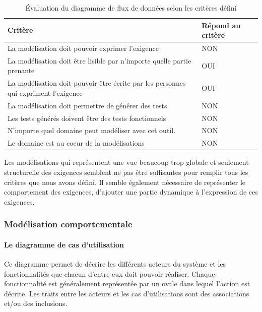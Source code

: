     \begin{table}[H]
    \centering
     \begin{tabular}{|p{25em}|p{5em}|} 
     \hline
    Critère & Répond au critère \\ [0.5ex] 
     \hline
     La modélisation doit pouvoir exprimer l’exigence & \cellcolor[HTML]{D03737}NON\\
     \hline
    La modélisation doit être lisible par n’importe quelle partie prenante & \cellcolor[HTML]{699A73}OUI\\
     \hline
    La modélisation doit pouvoir être écrite par les personnes qui expriment l’exigence &\cellcolor[HTML]{699A73} OUI \\
     \hline
    La modélisation doit permettre de générer des tests & \cellcolor[HTML]{D03737}NON \\
     \hline
    Les tests générés doivent être des tests fonctionnels &\cellcolor[HTML]{D03737} NON\\ 
     \hline
    N’importe quel domaine peut modéliser avec cet outil.&\cellcolor[HTML]{D03737} NON\\ 
     \hline
    Le domaine est au coeur de la modélisations &\cellcolor[HTML]{D03737} NON\\ 
    \hline 
    \end{tabular}
    \caption{Évaluation du diagramme de flux de données selon les critères défini}
    \end{table}

    Les modélisations qui représentent une vue beaucoup trop globale et seulement structurelle des exigences semblent ne pas être suffisantes pour remplir tous les critères que nous avons défini. Il semble également nécessaire de représenter le comportement des exigences, d'ajouter une partie dynamique à l'expression de ces exigences. 
        
        \subsubsection{Modélisation comportementale}

            \paragraph{Le diagramme de cas d'utilisation}

            Ce diagramme permet de décrire les différents acteurs du système et les fonctionnalités que chacun d'entre eux doit pouvoir réaliser. Chaque fonctionnalité est généralement représentée par un ovale dans lequel l'action est décrite. Les traits entre les acteurs et les cas d'utilisations sont des associations et/ou des inclusions. 

